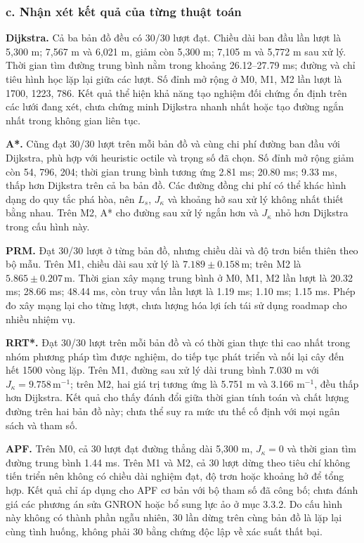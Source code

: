 \documentclass[12pt,a4paper,oneside]{report}
\begin{document}
\clearpage
\subsubsection*{c. Nhận xét kết quả của từng thuật toán}

\noindent\textbf{Dijkstra.} Cả ba bản đồ đều có 30/30 lượt đạt. Chiều dài ban đầu lần lượt là 5,300 m; 7,567 m và 6,021 m, giảm còn 5,300 m; 7,105 m và 5,772 m sau xử lý. Thời gian tìm đường trung bình nằm trong khoảng 26.12--27.79 ms; đường và chỉ tiêu hình học lặp lại giữa các lượt. Số đỉnh mở rộng ở M0, M1, M2 lần lượt là 1700, 1223, 786. Kết quả thể hiện khả năng tạo nghiệm đối chứng ổn định trên các lưới đang xét, chưa chứng minh Dijkstra nhanh nhất hoặc tạo đường ngắn nhất trong không gian liên tục.

\noindent\textbf{A*.} Cũng đạt 30/30 lượt trên mỗi bản đồ và cùng chi phí đường ban đầu với Dijkstra, phù hợp với heuristic octile và trọng số đã chọn. Số đỉnh mở rộng giảm còn 54, 796, 204; thời gian trung bình tương ứng 2.81 ms; 20.80 ms; 9.33 ms, thấp hơn Dijkstra trên cả ba bản đồ. Các đường đồng chi phí có thể khác hình dạng do quy tắc phá hòa, nên \(L_s\), \(J_\kappa\) và khoảng hở sau xử lý không nhất thiết bằng nhau. Trên M2, A* cho đường sau xử lý ngắn hơn và \(J_\kappa\) nhỏ hơn Dijkstra trong cấu hình này.

\noindent\textbf{PRM.} Đạt 30/30 lượt ở từng bản đồ, nhưng chiều dài và độ trơn biến thiên theo bộ mẫu. Trên M1, chiều dài sau xử lý là \(7.189\pm0.158\,\mathrm{m}\); trên M2 là \(5.865\pm0.207\,\mathrm{m}\). Thời gian xây mạng trung bình ở M0, M1, M2 lần lượt là 20.32 ms; 28.66 ms; 48.44 ms, còn truy vấn lần lượt là 1.19 ms; 1.10 ms; 1.15 ms. Phép đo xây mạng lại cho từng lượt, chưa lượng hóa lợi ích tái sử dụng roadmap cho nhiều nhiệm vụ.

\noindent\textbf{RRT*.} Đạt 30/30 lượt trên mỗi bản đồ và có thời gian thực thi cao nhất trong nhóm phương pháp tìm được nghiệm, do tiếp tục phát triển và nối lại cây đến hết 1500 vòng lặp. Trên M1, đường sau xử lý dài trung bình 7.030 m với \(J_\kappa=9.758\,\mathrm{m}^{-1}\); trên M2, hai giá trị tương ứng là 5.751 m và 3.166 \(\mathrm{m}^{-1}\), đều thấp hơn Dijkstra. Kết quả cho thấy đánh đổi giữa thời gian tính toán và chất lượng đường trên hai bản đồ này; chưa thể suy ra mức ưu thế cố định với mọi ngân sách và tham số.

\noindent\textbf{APF.} Trên M0, cả 30 lượt đạt đường thẳng dài 5,300 m, \(J_\kappa=0\) và thời gian tìm đường trung bình 1.44 ms. Trên M1 và M2, cả 30 lượt dừng theo tiêu chí không tiến triển nên không có chiều dài nghiệm đạt, độ trơn hoặc khoảng hở để tổng hợp. Kết quả chỉ áp dụng cho APF cơ bản với bộ tham số đã công bố; chưa đánh giá các phương án sửa GNRON hoặc bổ sung lực ảo ở mục 3.3.2. Do cấu hình này không có thành phần ngẫu nhiên, 30 lần dừng trên cùng bản đồ là lặp lại cùng tình huống, không phải 30 bằng chứng độc lập về xác suất thất bại.
\end{document}
